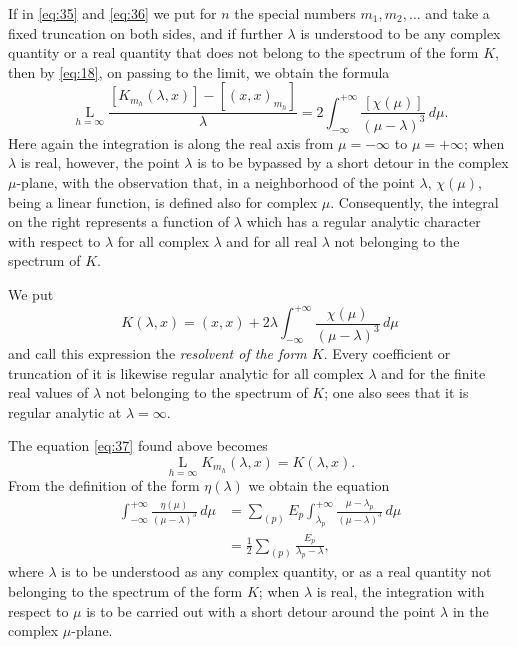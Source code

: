 \documentclass[b5paper,twoside]{article}
\newcommand{\originalpage}[1]{\phantomsection\label{origpage:#1}}
\begin{document}
If in \eqref{eq:35} and \eqref{eq:36} we put for $n$ the special numbers
$m_1,m_2,\ldots$ and take a fixed truncation on both sides, and if further
$\lambda$ is understood to be any complex quantity or a real quantity that
does not belong to the spectrum of the form $K$, then by \eqref{eq:18}, on
passing to the limit, we obtain the formula
\begin{equation}
\tag{37}\label{eq:37}
  \mathop{\mathrm{L}}\limits_{h=\infty}
  \frac{[K_{m_h}(\lambda,x)]-[(x,x)_{m_h}]}{\lambda}
  =2\int_{-\infty}^{+\infty}
    \frac{[\chi(\mu)]}{(\mu-\lambda)^3}\,d\mu.
\end{equation}
Here again the integration is along the real axis from $\mu=-\infty$ to
$\mu=+\infty$; when $\lambda$ is real, however, the point $\lambda$ is to be
bypassed by a short detour in the complex $\mu$-plane, with the observation
that, in a neighborhood of the point $\lambda$, $\chi(\mu)$, being a linear
function, is defined also\originalpage{174} for complex $\mu$.  Consequently,
the integral on the right represents a function of $\lambda$ which has a
regular analytic character with respect to $\lambda$ for all complex
$\lambda$ and for all real $\lambda$ not belonging to the spectrum of $K$.

We put
\begin{equation}
\tag{38}\label{eq:38}
  K(\lambda,x)=(x,x)+2\lambda
  \int_{-\infty}^{+\infty}
    \frac{\chi(\mu)}{(\mu-\lambda)^3}\,d\mu
\end{equation}
and call this expression the \emph{resolvent of the form $K$}.  Every
coefficient or truncation of it is likewise regular analytic for all complex
$\lambda$ and for the finite real values of $\lambda$ not belonging to the
spectrum of $K$; one also sees that it is regular analytic at
$\lambda=\infty$.

The equation \eqref{eq:37} found above becomes
\[
  \mathop{\mathrm{L}}\limits_{h=\infty}K_{m_h}(\lambda,x)=K(\lambda,x).
\]
From the definition of the form $\eta(\lambda)$ we obtain the equation
\begin{equation}
\tag{39}\label{eq:39}
\begin{aligned}
  \int_{-\infty}^{+\infty}
    \frac{\eta(\mu)}{(\mu-\lambda)^3}\,d\mu
  &=\sum_{(p)}E_p
    \int_{\lambda_p}^{+\infty}
    \frac{\mu-\lambda_p}{(\mu-\lambda)^3}\,d\mu\\
  &=\frac12\sum_{(p)}\frac{E_p}{\lambda_p-\lambda},
\end{aligned}
\end{equation}
where $\lambda$ is to be understood as any complex quantity, or as a real
quantity not belonging to the spectrum of the form $K$; when $\lambda$ is
real, the integration with respect to $\mu$ is to be carried out with a short
detour around the point $\lambda$ in the complex $\mu$-plane.
\end{document}
